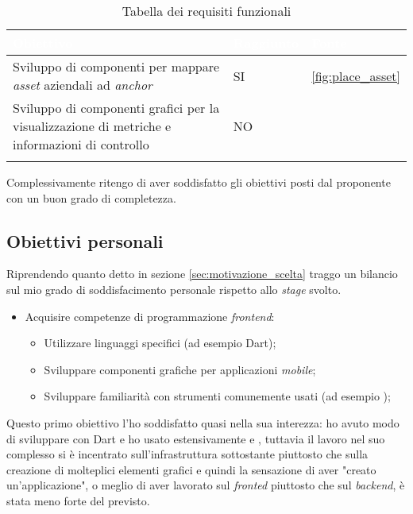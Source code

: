 {
    \setlength{\freewidth}{\dimexpr\textwidth-10\tabcolsep}
    \renewcommand{\arraystretch}{1.5}
    \centering
    \setlength{\aboverulesep}{0pt}
    \setlength{\belowrulesep}{0pt}
    \begin{longtable}{C{.8\freewidth} C{.162\freewidth} C{.115\freewidth}}
       \toprule
    \textcolor{white}{\textbf{Obiettivo}}&
    \textcolor{white}{\textbf{Raggiunto}}&
    \textcolor{white}{\textbf{Fonte}}\\
    \toprule
    \endhead
    
    Sviluppo di componenti per mappare \textit{asset} aziendali ad \textit{anchor} & SI & \ref{fig:place_asset}\\
    Sviluppo di componenti grafici per la visualizzazione di metriche e informazioni di controllo& NO & \\

    \bottomrule
    \caption{Tabella dei requisiti funzionali}
    \end{longtable}
}
Complessivamente ritengo di aver soddisfatto gli obiettivi posti dal proponente con un buon grado di completezza.

\subsection{Obiettivi personali}
Riprendendo quanto detto in sezione \ref{sec:motivazione_scelta} traggo un bilancio sul mio grado di soddisfacimento personale rispetto allo \textit{stage} svolto.

\begin{itemize}
  \item Acquisire competenze di programmazione \textit{frontend}:
      \begin{itemize}
          \item Utilizzare linguaggi specifici (ad esempio Dart);
          \item Sviluppare componenti grafiche per applicazioni \textit{mobile};
          \item Sviluppare familiarità con strumenti comunemente usati (ad esempio \vsc);
      \end{itemize}
\end{itemize}

Questo primo obiettivo l'ho soddisfatto quasi nella sua interezza: ho avuto modo di sviluppare con Dart e ho usato estensivamente \vsc{} e \astudio{}, tuttavia il lavoro nel suo complesso si è incentrato sull'infrastruttura sottostante piuttosto che sulla creazione di molteplici elementi grafici e quindi la sensazione di aver "creato un'applicazione", o meglio di aver lavorato sul \textit{fronted} piuttosto che sul \textit{backend}, è stata meno forte del previsto.

